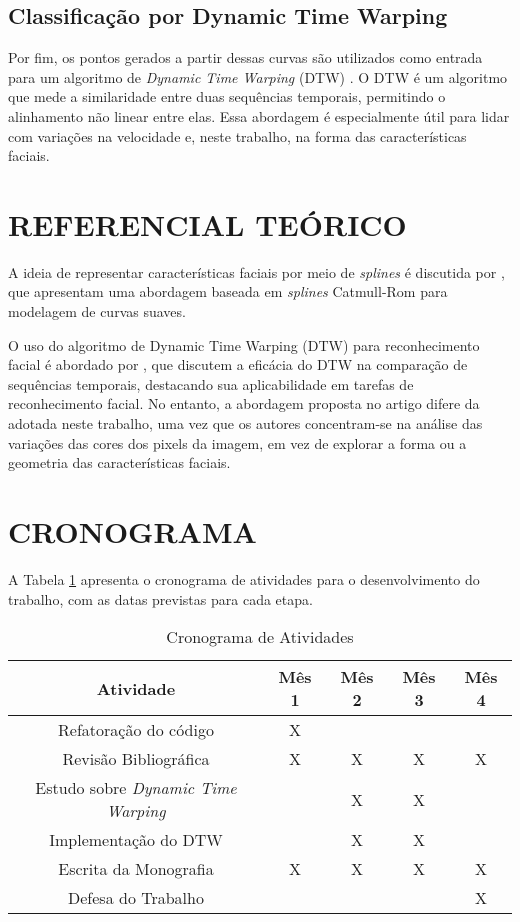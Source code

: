 \subsection{Classificação por Dynamic Time Warping}

Por fim, os pontos gerados a partir dessas curvas são utilizados como entrada para um algoritmo de \textit{Dynamic Time Warping} (DTW) \cite{SAKOE, tavenard.blog.dtw}. O DTW é um algoritmo que mede a similaridade entre duas sequências temporais, permitindo o alinhamento não linear entre elas. Essa abordagem é especialmente útil para lidar com variações na velocidade e, neste trabalho, na forma das características faciais.

\section{REFERENCIAL TEÓRICO}

A ideia de representar características faciais por meio de \textit{splines} é discutida por \citet{RepresentationSplines}, que apresentam uma abordagem baseada em \textit{splines} Catmull-Rom para modelagem de curvas suaves. 

O uso do algoritmo de Dynamic Time Warping (DTW) para reconhecimento facial é abordado por \citet{DTW_LSTM}, que discutem a eficácia do DTW na comparação de sequências temporais, destacando sua aplicabilidade em tarefas de reconhecimento facial. No entanto, a abordagem proposta no artigo difere da adotada neste trabalho, uma vez que os autores concentram-se na análise das variações das cores dos pixels da imagem, em vez de explorar a forma ou a geometria das características faciais.

\section{CRONOGRAMA}

A Tabela \ref{tab:crono} apresenta o cronograma de atividades para o desenvolvimento do trabalho, com as datas previstas para cada etapa.

\begin{table}[ht] 
    \centering
    \caption{Cronograma de Atividades}
    \label{tab:crono}
    \begin{tabular}{|c|c|c|c|c|}
    \hline
    \textbf{Atividade} & \textbf{Mês 1} & \textbf{Mês 2} & \textbf{Mês 3} & \textbf{Mês 4} \\ \hline
    Refatoração do código & X &  &  & \\ \hline
    Revisão Bibliográfica &  X & X & X & X \\ \hline
    Estudo sobre \textit{Dynamic Time Warping} &  & X & X & \\ \hline
    Implementação do DTW &  & X & X & \\ \hline
    Escrita da Monografia & X & X & X & X \\ \hline
    Defesa do Trabalho &  &  &  &  X\\ \hline
    \end{tabular}
\end{table}
